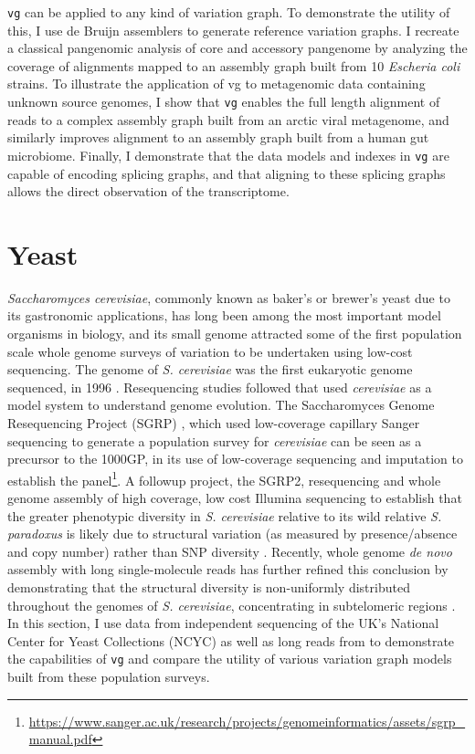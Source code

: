 {\tt vg} can be applied to any kind of variation graph.
To demonstrate the utility of this, I use de Bruijn assemblers to generate reference variation graphs.
I recreate a classical pangenomic analysis of core and accessory pangenome by analyzing the coverage of alignments mapped to an assembly graph built from 10 \emph{Escheria coli} strains.
To illustrate the application of vg to metagenomic data containing unknown source genomes, I show that {\tt vg} enables the full length alignment of reads to a complex assembly graph built from an arctic viral metagenome, and similarly improves alignment to an assembly graph built from a human gut microbiome.
Finally, I demonstrate that the data models and indexes in {\tt vg} are capable of encoding splicing graphs, and that aligning to these splicing graphs allows the direct observation of the transcriptome.

\section{Yeast}

\emph{Saccharomyces cerevisiae}, commonly known as baker's or brewer's yeast due to its gastronomic applications, has long been among the most important model organisms in biology, and its small genome attracted some of the first population scale whole genome surveys of variation to be undertaken using low-cost sequencing.
The genome of \emph{S. cerevisiae} was the first eukaryotic genome sequenced, in 1996 \cite{goffeau1996life}.
Resequencing studies followed that used \emph{cerevisiae} as a model system to understand genome evolution.
The Saccharomyces Genome Resequencing Project (SGRP) \cite{liti2009population}, which used low-coverage capillary Sanger sequencing to generate a population survey for \emph{cerevisiae} can be seen as a precursor to the 1000GP, in its use of low-coverage sequencing and imputation to establish the panel\footnote{\url{https://www.sanger.ac.uk/research/projects/genomeinformatics/assets/sgrp_manual.pdf}}.
A followup project, the SGRP2, resequencing and whole genome assembly of high coverage, low cost Illumina sequencing to establish that the greater phenotypic diversity in \emph{S. cerevisiae} relative to its wild relative \emph{S. paradoxus} is likely due to structural variation (as measured by presence/absence and copy number) rather than SNP diversity \cite{bergstrom2014high}.
Recently, whole genome \emph{de novo} assembly with long single-molecule reads has further refined this conclusion by demonstrating that the structural diversity is non-uniformly distributed throughout the genomes of \emph{S. cerevisiae}, concentrating in subtelomeric regions \cite{yue2017contrasting}.
In this section, I use data from independent sequencing of the UK's National Center for Yeast Collections (NCYC) as well as long reads from \cite{yue2017contrasting} to demonstrate the capabilities of {\tt vg} and compare the utility of various variation graph models built from these population surveys.


